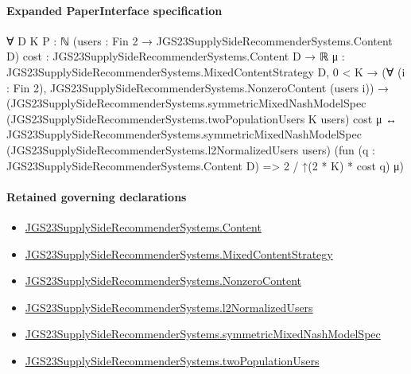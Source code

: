 \documentclass[10pt]{article}
\begin{document}
\paragraph{Expanded PaperInterface specification}
\begin{ReviewVerbatim}
∀ {D K P : ℕ} (users : Fin 2 → JGS23SupplySideRecommenderSystems.Content D)
  {cost : JGS23SupplySideRecommenderSystems.Content D → ℝ}
  {μ : JGS23SupplySideRecommenderSystems.MixedContentStrategy D},
  0 < K →
    (∀ (i : Fin 2), JGS23SupplySideRecommenderSystems.NonzeroContent (users i)) →
      (JGS23SupplySideRecommenderSystems.symmetricMixedNashModelSpec
          (JGS23SupplySideRecommenderSystems.twoPopulationUsers K users) cost μ ↔
        JGS23SupplySideRecommenderSystems.symmetricMixedNashModelSpec
          (JGS23SupplySideRecommenderSystems.l2NormalizedUsers users)
          (fun (q : JGS23SupplySideRecommenderSystems.Content D) => 2 / ↑(2 * K) * cost q) μ)
\end{ReviewVerbatim}

\paragraph{Retained governing declarations}
\begin{itemize}\raggedright
\item \hyperlink{governing-declaration-367305fda50f0ada}{JGS23\allowbreak{}Supply\allowbreak{}Side\allowbreak{}Recommender\allowbreak{}Systems.\allowbreak{}Content}
\item \hyperlink{governing-declaration-2089965d06cf0282}{JGS23\allowbreak{}Supply\allowbreak{}Side\allowbreak{}Recommender\allowbreak{}Systems.\allowbreak{}Mixed\allowbreak{}Content\allowbreak{}Strategy}
\item \hyperlink{governing-declaration-90e2ac7d13788c50}{JGS23\allowbreak{}Supply\allowbreak{}Side\allowbreak{}Recommender\allowbreak{}Systems.\allowbreak{}Nonzero\allowbreak{}Content}
\item \hyperlink{governing-declaration-779b1905167bbb9e}{JGS23\allowbreak{}Supply\allowbreak{}Side\allowbreak{}Recommender\allowbreak{}Systems.\allowbreak{}l2\allowbreak{}Normalized\allowbreak{}Users}
\item \hyperlink{paper-prerequisite-b412efba7deb757f}{JGS23\allowbreak{}Supply\allowbreak{}Side\allowbreak{}Recommender\allowbreak{}Systems.\allowbreak{}symmetric\allowbreak{}Mixed\allowbreak{}Nash\allowbreak{}Model\allowbreak{}Spec}
\item \hyperlink{governing-declaration-43b84bc2140424db}{JGS23\allowbreak{}Supply\allowbreak{}Side\allowbreak{}Recommender\allowbreak{}Systems.\allowbreak{}two\allowbreak{}Population\allowbreak{}Users}
\end{itemize}
\end{document}

